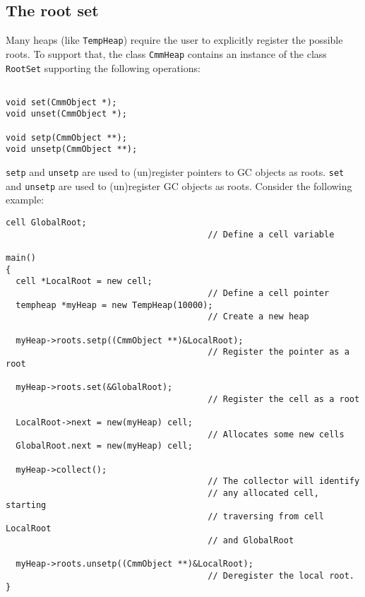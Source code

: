 \subsection{The root set}

Many heaps (like {\tt TempHeap}) require the user to explicitly
register the possible roots.
To support that, the class {\tt CmmHeap} contains an instance of the class
{\tt RootSet} supporting the following operations:

\begin{verbatim}

void set(CmmObject *);
void unset(CmmObject *);

void setp(CmmObject **);
void unsetp(CmmObject **);
\end{verbatim}

{\tt setp} and {\tt unsetp} are used to (un)register pointers
to GC objects as roots.
{\tt set} and {\tt unsetp} are used to (un)register GC objects
as roots.
Consider the following example:

\begin{verbatim}
cell GlobalRoot;                            
                                        // Define a cell variable

main()
{
  cell *LocalRoot = new cell;               
                                        // Define a cell pointer
  tempheap *myHeap = new TempHeap(10000); 
                                        // Create a new heap

  myHeap->roots.setp((CmmObject **)&LocalRoot);  
                                        // Register the pointer as a root

  myHeap->roots.set(&GlobalRoot);           
                                        // Register the cell as a root

  LocalRoot->next = new(myHeap) cell;   
                                        // Allocates some new cells
  GlobalRoot.next = new(myHeap) cell;

  myHeap->collect();                        
                                        // The collector will identify
                                        // any allocated cell, starting
                                        // traversing from cell LocalRoot
                                        // and GlobalRoot

  myHeap->roots.unsetp((CmmObject **)&LocalRoot);
                                        // Deregister the local root.
}
\end{verbatim}

